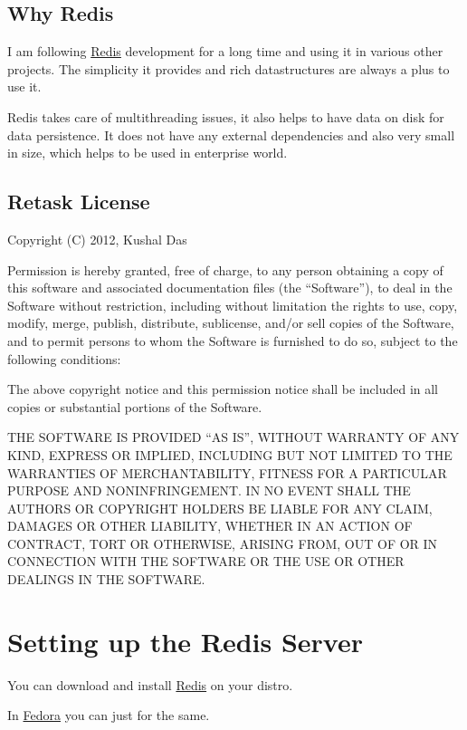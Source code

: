 \documentclass[letterpaper,10pt,english]{sphinxmanual}
\begin{document}
\subsection{Why Redis}
\label{user/intro:why-redis}
I am following \href{http://redis.io}{Redis}  development for a long time and using
it in various other projects. The simplicity it provides and rich datastructures
are always a plus to use it.

Redis takes care of multithreading issues, it also helps to have data on disk for
data persistence. It does not have any external dependencies and also very small
in size, which helps to be used in enterprise world.


\subsection{Retask License}
\label{user/intro:retask-license}
Copyright (C) 2012, Kushal Das

Permission is hereby granted, free of charge, to any person obtaining a copy of this software and associated documentation files (the ``Software''), to deal in the Software without restriction, including without limitation the rights to use, copy, modify, merge, publish, distribute, sublicense, and/or sell copies of the Software, and to permit persons to whom the Software is furnished to do so, subject to the following conditions:

The above copyright notice and this permission notice shall be included in all copies or substantial portions of the Software.

THE SOFTWARE IS PROVIDED ``AS IS'', WITHOUT WARRANTY OF ANY KIND, EXPRESS OR IMPLIED, INCLUDING BUT NOT LIMITED TO THE WARRANTIES OF MERCHANTABILITY, FITNESS FOR A PARTICULAR PURPOSE AND NONINFRINGEMENT. IN NO EVENT SHALL THE AUTHORS OR COPYRIGHT HOLDERS BE LIABLE FOR ANY CLAIM, DAMAGES OR OTHER LIABILITY, WHETHER IN AN ACTION OF CONTRACT, TORT OR OTHERWISE, ARISING FROM, OUT OF OR IN CONNECTION WITH THE SOFTWARE OR THE USE OR OTHER DEALINGS IN THE SOFTWARE.


\section{Setting up the Redis Server}
\label{user/redis::doc}\label{user/redis:setting-up-the-redis-server}
You can download and install \href{http://redis.io}{Redis} on your distro.

In \href{http://fedoraproject.org}{Fedora} you can just 
for the same.
\end{document}
